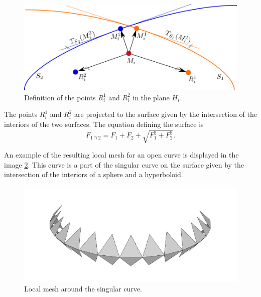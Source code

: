 \begin{figure}
    \centerline{\includegraphics[scale=0.5]{images/img39}}
    \caption[Definition of the points]
    {Definition of the points $R_i^1$ and $R_i^2$ in the plane $H_i$.}
    \label{img:39}
\end{figure}

The points $R_i^1$ and $R_i^2$ are projected to the surface given by the intersection
of the interiors of the two surfaces. The equation defining the surface is 
$$F_{1 \cap 2} = F_1 + F_2 + \sqrt{F_1^2+F_2^2}.$$

An example of the resulting local mesh for an open curve is displayed in the image
\ref{img:local-mesh-sing-curve}. This curve is a part of the singular curve on the surface 
given by the intersection of the interiors of a sphere and a hyperboloid.

\begin{figure}
    \centerline{\includegraphics[scale=0.3]{images/local-mesh-sing-curve}}
    \caption[Local mesh around the singular curve]
    {Local mesh around the singular curve.}
    \label{img:local-mesh-sing-curve}
\end{figure}